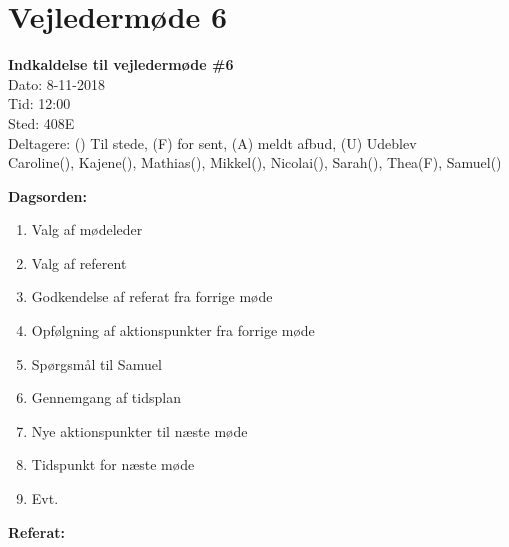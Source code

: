 \section{Vejledermøde 6}

\vspace{0.5 cm}
\textbf{Indkaldelse til vejledermøde \#6} \\

Dato: 8-11-2018 \\
Tid: 12:00 \\
Sted: 408E \\
Deltagere: () Til stede, (F) for sent, (A) meldt afbud, (U) Udeblev \\
Caroline(), Kajene(), Mathias(), Mikkel(), Nicolai(), Sarah(), Thea(F), Samuel() 

\vspace{0.1 cm}
\textbf{Dagsorden:}

\begin{enumerate}
	\item Valg af mødeleder
	\item Valg af referent
	\item Godkendelse af referat fra forrige møde
	\item Opfølgning af aktionspunkter fra forrige møde
	\item Spørgsmål til Samuel
	\item Gennemgang af tidsplan
	\item Nye aktionspunkter til næste møde
	\item Tidspunkt for næste møde
	\item Evt.
\end{enumerate}

\textbf{Referat:}

